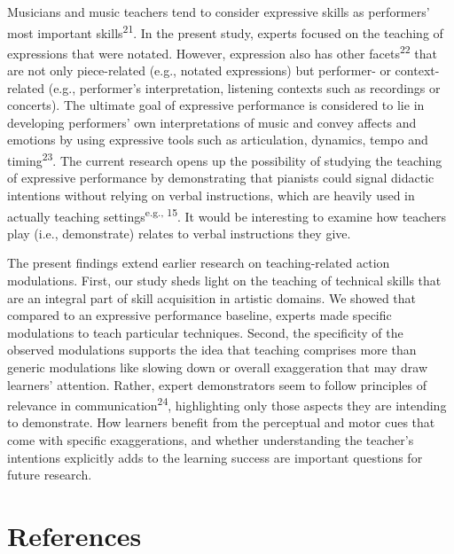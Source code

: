 \documentclass[
  man,floatsintext]{apa6}
\begin{document}
Musicians and music teachers tend to consider expressive skills as performers' most important skills\textsuperscript{21}. In the present study, experts focused on the teaching of expressions that were notated. However, expression also has other facets\textsuperscript{22} that are not only piece-related (e.g., notated expressions) but performer- or context-related (e.g., performer's interpretation, listening contexts such as recordings or concerts). The ultimate goal of expressive performance is considered to lie in developing performers' own interpretations of music and convey affects and emotions by using expressive tools such as articulation, dynamics, tempo and timing\textsuperscript{23}. The current research opens up the possibility of studying the teaching of expressive performance by demonstrating that pianists could signal didactic intentions without relying on verbal instructions, which are heavily used in actually teaching settings\textsuperscript{e.g., 15}. It would be interesting to examine how teachers play (i.e., demonstrate) relates to verbal instructions they give.

The present findings extend earlier research on teaching-related action modulations. First, our study sheds light on the teaching of technical skills that are an integral part of skill acquisition in artistic domains. We showed that compared to an expressive performance baseline, experts made specific modulations to teach particular techniques. Second, the specificity of the observed modulations supports the idea that teaching comprises more than generic modulations like slowing down or overall exaggeration that may draw learners' attention. Rather, expert demonstrators seem to follow principles of relevance in communication\textsuperscript{24}, highlighting only those aspects they are intending to demonstrate. How learners benefit from the perceptual and motor cues that come with specific exaggerations, and whether understanding the teacher's intentions explicitly adds to the learning success are important questions for future research.

\hypertarget{references}{%
\section{References}\label{references}}

\begingroup
\setlength{\parindent}{-0in}
\setlength{\leftskip}{0in}
\end{document}
